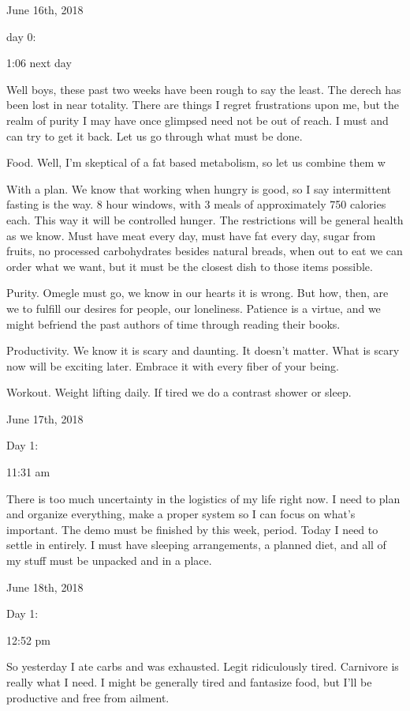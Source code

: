 \bigskip
\bigskip
June 16th, 2018

day 0:

1:06 next day

Well boys, these past two weeks have been rough to say the least. The
derech has been lost in near totality. There are things I regret
frustrations upon me, but the realm of purity I may have once glimpsed
need not be out of reach. I must and can try to get it back. Let us go
through what must be done.

Food. Well, I'm skeptical of a fat based metabolism, so let us combine
them w

With a plan. We know that working when hungry is good, so I say
intermittent fasting is the way. 8 hour windows, with 3 meals of
approximately 750 calories each. This way it will be controlled hunger.
The restrictions will be general health as we know. Must have meat every
day, must have fat every day, sugar from fruits, no processed
carbohydrates besides natural breads, when out to eat we can order what
we want, but it must be the closest dish to those items possible.

Purity. Omegle must go, we know in our hearts it is wrong. But how,
then, are we to fulfill our desires for people, our loneliness. Patience
is a virtue, and we might befriend the past authors of time through
reading their books.

Productivity. We know it is scary and daunting. It doesn't matter. What
is scary now will be exciting later. Embrace it with every fiber of your
being.

Workout. Weight lifting daily. If tired we do a contrast shower or
sleep.

\bigskip
\bigskip
June 17th, 2018

Day 1:

11:31 am

There is too much uncertainty in the logistics of my life right now. I
need to plan and organize everything, make a proper system so I can
focus on what's important. The demo must be finished by this week,
period. Today I need to settle in entirely. I must have sleeping
arrangements, a planned diet, and all of my stuff must be unpacked and
in a place.

\bigskip
\bigskip
June 18th, 2018

Day 1:

12:52 pm

So yesterday I ate carbs and was exhausted. Legit ridiculously tired.
Carnivore is really what I need. I might be generally tired and
fantasize food, but I'll be productive and free from ailment.

